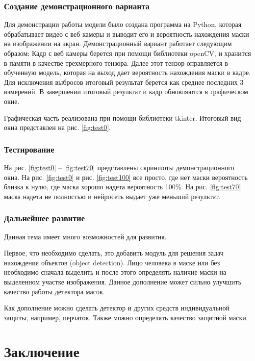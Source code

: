 \documentclass[a4paper,14pt]{article}
\begin{document}
	\subsubsection{Создание демонстрационного варианта}
	
	Для демонстрации работы модели было создана программа на Python, которая обрабатывает видео с веб камеры и выводит его и вероятность нахождения маски на изображении на экран.
	Демонстрационный вариант работает следующим образом:
	Кадр с веб камеры берется при помощи библиотеки openCV, и хранится в памяти в качестве трехмерного тензора.
	Далее этот тензор оправляется в обученную модель, которая на выход дает вероятность нахождения маски в кадре.
	Для исключения выбросов итоговый результат берется как среднее последних 3 измерений.
	В завершении итоговый результат и кадр обновляются в графическом окне.
	
	Графическая часть реализована при помощи библиотеки tkinter.
	Итоговый вид окна представлен на рис. \ref{fig:test0}.
	
	
	\subsubsection{Тестирование}
	
	На рис. \ref{fig:test0} -- \ref{fig:test70} представлены скриншоты демонстрационного окна.
	На рис. \ref{fig:test0} и рис. \ref{fig:test100} все просто, где нет маски вероятность близка к нулю, где маска хорошо надета вероятность 100\%.
	На рис. \ref{fig:test70} маска надета не полностью и нейросеть выдает уже меньший результат. 
	
	\subsubsection{Дальнейшее развитие}
	
	Данная тема имеет много возможностей для развития.
	
	Первое, что необходимо сделать, это добавить модуль для решения задач нахождения объектов (object detection).
	Лицо человека в маске или без необходимо сначала выделить и после этого определять наличие маски на выделенном участке изображения.
	Данное дополнение может сильно улучшить качество работы детектора масок.
	
	Как дополнение можно сделать детектор и других средств индивидуальной защиты, например, перчаток.
	Также можно определять качество защитной маски.
	
	\pagebreak
	\section{Заключение}
	
\end{document}
